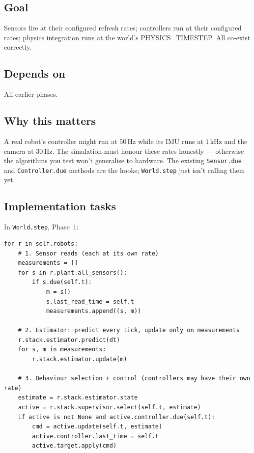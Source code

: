 \documentclass[11pt,a4paper]{article}
\newcommand{\code}[1]{\texttt{\small #1}}
\begin{document}
\subsection*{Goal}
Sensors fire at their configured refresh rates; controllers run at their
configured rates; physics integration runs at the world's PHYSICS\_TIMESTEP.
All co-exist correctly.

\subsection*{Depends on}
All earlier phases.

\subsection*{Why this matters}

A real robot's controller might run at $50\,\text{Hz}$ while its IMU runs
at $1\,\text{kHz}$ and the camera at $30\,\text{Hz}$. The simulation must
honour these rates honestly --- otherwise the algorithms you test won't
generalise to hardware. The existing \code{Sensor.due} and
\code{Controller.due} methods are the hooks; \code{World.step} just isn't
calling them yet.

\subsection*{Implementation tasks}

In \code{World.step}, Phase~1:

\begin{lstlisting}
for r in self.robots:
    # 1. Sensor reads (each at its own rate)
    measurements = []
    for s in r.plant.all_sensors():
        if s.due(self.t):
            m = s()
            s.last_read_time = self.t
            measurements.append((s, m))

    # 2. Estimator: predict every tick, update only on measurements
    r.stack.estimator.predict(dt)
    for s, m in measurements:
        r.stack.estimator.update(m)

    # 3. Behaviour selection + control (controllers may have their own rate)
    estimate = r.stack.estimator.state
    active = r.stack.supervisor.select(self.t, estimate)
    if active is not None and active.controller.due(self.t):
        cmd = active.update(self.t, estimate)
        active.controller.last_time = self.t
        active.target.apply(cmd)
\end{lstlisting}
\end{document}
